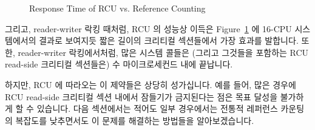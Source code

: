 \begin{figure}[tb]
\begin{center}
\end{center}
\caption{Response Time of RCU vs. Reference Counting}
\label{fig:defer:Response Time of RCU vs. Reference Counting}
\end{figure}

그리고, reader-writer 락킹 때처럼, RCU 의 성능상 이득은
Figure~\ref{fig:defer:Response Time of RCU vs. Reference Counting} 에 16-CPU
시스템에서의 결과로 보여지듯 짧은 길이의 크리티컬 섹션들에서 가장 효과를
발합니다.
또한, reader-writer 락킹에서처럼, 많은 시스템 콜들은 (그리고 그것들을 포함하는
RCU read-side 크리티컬 섹션들은) 수 마이크로세컨드 내에 끝납니다.

하지만, RCU 에 따라오는 이 제약들은 상당히 성가십니다.
예를 들어, 많은 경우에 RCU read-side 크리티컬 섹션 내에서 잠들기가 금지된다는
점은 목표 달성을 불가하게 할 수 있습니다.
다음 섹션에서는 적어도 일부 경우에서는 전통적 레퍼런스 카운팅의 복잡도를
낮추면서도 이 문제를 해결하는 방법들을 알아보겠습니다.
\iffalse

